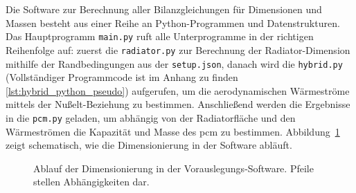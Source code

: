 Die Software zur Berechnung aller Bilanzgleichungen für Dimensionen und Massen besteht aus einer Reihe an Python-Programmen und Datenstrukturen.
Das Hauptprogramm \texttt{main.py} ruft alle Unterprogramme in der richtigen Reihenfolge auf: zuerst die \texttt{radiator.py} zur Berechnung
der Radiator-Dimension mithilfe der Randbedingungen aus der \texttt{setup.json}, danach wird die \texttt{hybrid.py} (Vollständiger Programmcode ist im Anhang zu finden \ref{lst:hybrid_python_pseudo}) aufgerufen, um die aerodynamischen Wärmeströme
mittels der Nußelt-Beziehung zu bestimmen. Anschließend werden die Ergebnisse in die \texttt{pcm.py} geladen, um abhängig von der Radiatorfläche
und den Wärmeströmen die Kapazität und Masse des \ac{pcm} zu bestimmen.
Abbildung~\ref{fig:dimensionierung_ablauf} zeigt schematisch, wie die Dimensionierung in der Software abläuft.

\begin{figure}
  \centering
  \caption{Ablauf der Dimensionierung in der Vorauslegungs-Software. Pfeile stellen Abhängigkeiten dar.}\label{fig:dimensionierung_ablauf}
\end{figure}

